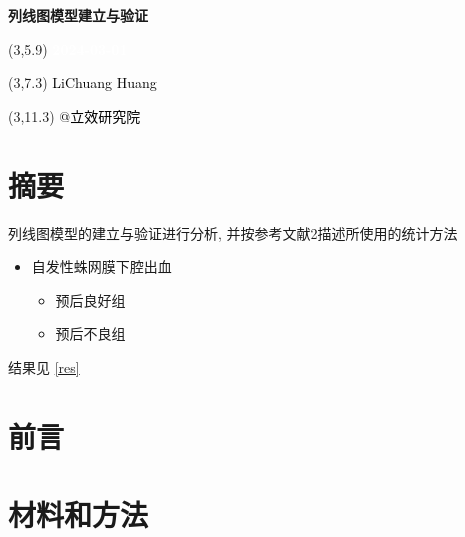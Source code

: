 \documentclass[
]{article}
\author{}
\date{\vspace{-2.5em}}
\providecommand{\tightlist}{%
  \setlength{\itemsep}{0pt}\setlength{\parskip}{0pt}}
\begin{document}
\begin{titlepage} 
\begin{center} \textbf{\Huge
列线图模型建立与验证} \vspace{4em}
\begin{textblock}{10}(3,5.9) \huge
\textbf{\textcolor{white}{2024-03-01}}
\end{textblock} \begin{textblock}{10}(3,7.3)
\Large \textcolor{black}{LiChuang Huang}
\end{textblock} \begin{textblock}{10}(3,11.3)
\Large \textcolor{black}{@立效研究院}
\end{textblock} \end{center} \end{titlepage}
\restoregeometry


\tableofcontents

\listoffigures

\listoftables

\newpage


\hypertarget{abstract}{%
\section{摘要}\label{abstract}}

列线图模型的建立与验证进行分析, 并按参考文献2描述所使用的统计方法

\begin{itemize}
\tightlist
\item
  自发性蛛网膜下腔出血

  \begin{itemize}
  \tightlist
  \item
    预后良好组
  \item
    预后不良组
  \end{itemize}
\end{itemize}

结果见 \ref{res}

\hypertarget{introduction}{%
\section{前言}\label{introduction}}

\hypertarget{methods}{%
\section{材料和方法}\label{methods}}
\end{document}
